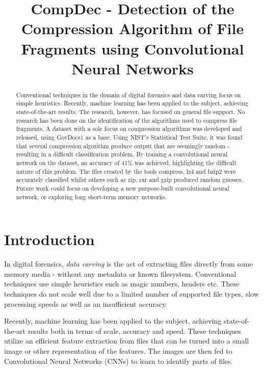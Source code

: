 \documentclass[conference]{IEEEtran}
\begin{document}
\title{CompDec - Detection of the Compression Algorithm of File Fragments using Convolutional Neural Networks}

\author{
}

\maketitle

\begin{abstract}
    Conventional techniques in the domain of digital forensics and data carving focus on simple heuristics. Recently, machine learning has been applied to the subject, achieving state-of-the-art results. The research, however, has focused on general file support. No research has been done on the identification of the algorithms used to compress file fragments. A dataset with a sole focus on compression algorithms was developed and released, using GovDocs1 as a base. Using NIST's Statistical Test Suite, it was found that several compression algorithm produce output that are seemingly random - resulting in a difficult classification problem. By training a convolutional neural network on the dataset, an accuracy of 41\% was achieved, highlighting the difficult nature of this problem. The files created by the tools compress, lz4 and bzip2 were accurately classified whilst others such as zip, rar and gzip produced random guesses. Future work could focus on developing a new purpose-built convolutional neural network, or exploring long short-term memory networks.
\end{abstract}

\section{Introduction}

In digital forensics, \textit{data carving} is the act of extracting files directly from some memory media - without any metadata or known filesystem. Conventional techniques use simple heuristics such as magic numbers, headers etc. These techniques do not scale well due to a limited number of supported file types, slow processing speeds as well as an insufficient accuracy\cite{chen2018}.

Recently, machine learning has been applied to the subject, achieving state-of-the-art results both in terms of scale, accuracy and speed. These techniques utilize an efficient feature extraction from files that can be turned into a small image or other representation of the features. The images are then fed to Convolutional Neural Networks (CNNs) to learn to identify parts of files.
\end{document}
